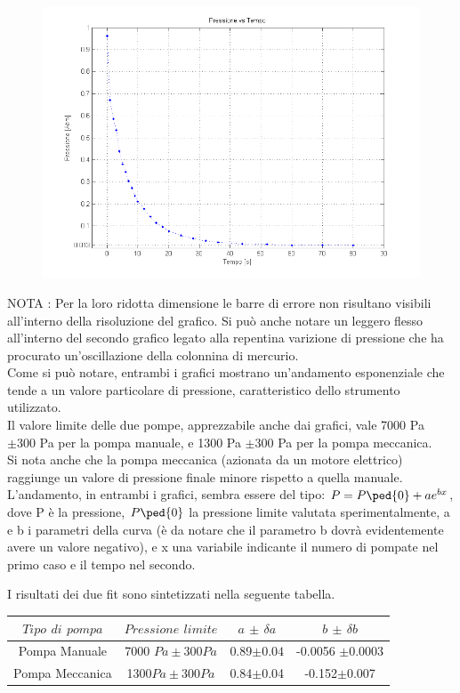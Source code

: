 \documentclass[a4paper,11pt]{article}
\begin{document}
\begin{figure}[htbp]
\centering
\includegraphics[width=15cm]{grafico_Pt.png}
\end{figure}


NOTA : Per la loro ridotta dimensione le barre di errore non risultano visibili all'interno della risoluzione del grafico. Si può anche notare un leggero flesso all'interno del secondo grafico legato alla repentina varizione di pressione che ha procurato un'oscillazione della colonnina di mercurio.\\


Come si può notare, entrambi i grafici mostrano un'andamento esponenziale che tende a un valore particolare di pressione, caratteristico dello strumento utilizzato. \\
Il valore limite delle due pompe, apprezzabile anche dai grafici, vale 7000 Pa $\pm 300$ Pa per la pompa manuale, e 1300 Pa $\pm 300$ Pa per la pompa meccanica.\\
Si nota anche che la pompa meccanica (azionata da un motore elettrico) raggiunge un valore di pressione finale minore rispetto a quella manuale.
L'andamento, in entrambi i grafici, sembra essere del tipo: $P=P\ped{0}+ae^{bx}$, dove P è la pressione, $P\ped{0}$ la pressione limite valutata sperimentalmente, a e b i parametri della curva (è da notare che il parametro b dovrà evidentemente avere un valore negativo), e x una variabile indicante il numero di pompate nel primo caso e il tempo nel secondo.

I risultati dei due fit sono sintetizzati nella seguente tabella.\\
\begin{center}
\begin{tabular}{|c|c|c|c|}
\hline $Tipo$ $di$ $pompa$ & $Pressione$ $limite$ & $a$ $\pm$ $\delta a$ & $b$ $\pm$ $\delta b$ \\ 
\hline Pompa Manuale & 7000 $Pa \pm 300 Pa$ & 0.89$\pm 0.04$  &-0.0056 $\pm0.0003$  \\ 
\hline Pompa Meccanica & 1300$Pa \pm 300Pa$ & 0.84$\pm$0.04 & -0.152$\pm$0.007 \\ 
\hline 
\end{tabular} 
\end{center}
\end{document}
